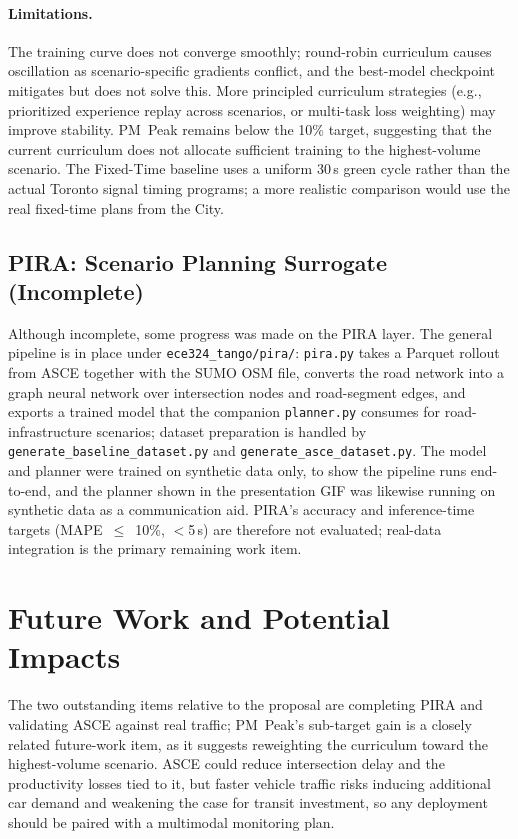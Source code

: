\documentclass{article}
\begin{document}
\paragraph{Limitations.}
The training curve does not converge smoothly; round-robin curriculum causes oscillation as scenario-specific gradients conflict, and the best-model checkpoint mitigates but does not solve this. More principled curriculum strategies (e.g., prioritized experience replay across scenarios, or multi-task loss weighting) may improve stability. PM~Peak remains below the 10\% target, suggesting that the current curriculum does not allocate sufficient training to the highest-volume scenario. The Fixed-Time baseline uses a uniform 30\,s green cycle rather than the actual Toronto signal timing programs; a more realistic comparison would use the real fixed-time plans from the City.

\subsection{PIRA: Scenario Planning Surrogate (Incomplete)}
\label{sec:pira}

Although incomplete, some progress was made on the PIRA layer. The general pipeline is in place under \texttt{ece324\_tango/pira/}: \texttt{pira.py} takes a Parquet rollout from ASCE together with the SUMO OSM file, converts the road network into a graph neural network over intersection nodes and road-segment edges, and exports a trained model that the companion \texttt{planner.py} consumes for road-infrastructure scenarios; dataset preparation is handled by \texttt{generate\_baseline\_dataset.py} and \texttt{generate\_asce\_dataset.py}. The model and planner were trained on synthetic data only, to show the pipeline runs end-to-end, and the planner shown in the presentation GIF was likewise running on synthetic data as a communication aid. PIRA's accuracy and inference-time targets (MAPE~$\leq$~10\%, $<$5\,s) are therefore not evaluated; real-data integration is the primary remaining work item.


\section{Future Work and Potential Impacts}
\label{sec:future}

The two outstanding items relative to the proposal are completing PIRA and validating ASCE against real traffic; PM~Peak's sub-target gain is a closely related future-work item, as it suggests reweighting the curriculum toward the highest-volume scenario. ASCE could reduce intersection delay and the productivity losses tied to it, but faster vehicle traffic risks inducing additional car demand and weakening the case for transit investment, so any deployment should be paired with a multimodal monitoring plan.
\end{document}
